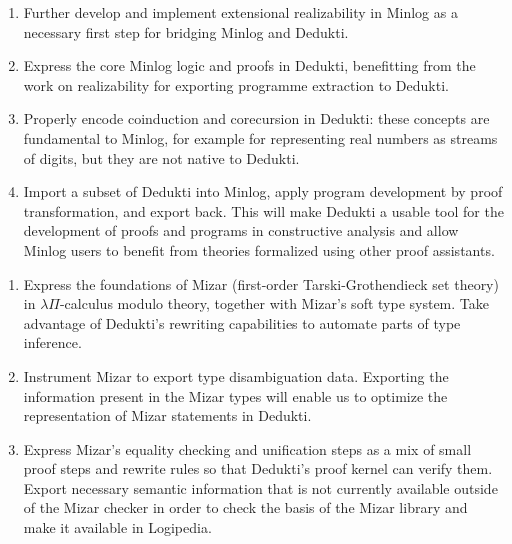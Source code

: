 \begin{workpackage}
\begin{tasklist}
\begin{task}[id=minlog,
  title=Express the theory of Minlog in Dedukti,
  lead=Lmu,
  LmuRM=18 %
  ]
  \begin{enumerate}
  \item Further develop and implement extensional realizability in Minlog as
    a necessary first step for bridging Minlog and Dedukti.
  \item Express the core Minlog logic and proofs in Dedukti, benefitting from
    the work on realizability for exporting programme extraction to Dedukti.
  \item Properly encode coinduction and corecursion in Dedukti: these concepts are
    fundamental to Minlog, for example for representing real numbers as streams of
    digits, but they are not native to Dedukti.
  \item Import a subset of Dedukti into Minlog, apply program development by proof
    transformation, and export back. This will make Dedukti a usable tool for the
    development of proofs and programs in constructive analysis and allow Minlog
    users to benefit from theories formalized using other proof assistants.
  \end{enumerate}
\end{task}

\begin{task}[id=mizar,
  title=Express the theory of Mizar in Dedukti,
  lead=Bia,   %
  BiaRM=70, %
  InnRM=9   %
  ]
  \begin{enumerate}
  \item Express the foundations of Mizar (first-order Tarski-Grothendieck set
    theory) in $\lambda\Pi$-calculus modulo theory, together with Mizar's soft
    type system. Take advantage of Dedukti's rewriting capabilities to automate
    parts of type inference.
  \item Instrument Mizar to export type disambiguation data. Exporting the
    information present in the Mizar types will enable us to optimize the
    representation of Mizar statements in Dedukti.
  \item Express Mizar's equality checking and unification steps as a mix of
    small proof steps and rewrite rules so that Dedukti's proof kernel can
    verify them. Export necessary semantic information that is not currently
    available outside of the Mizar checker in order to check the basis of the
    Mizar library and make it available in Logipedia.
  \end{enumerate}
\end{task}


\end{tasklist}
\end{workpackage}
